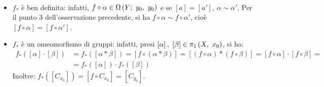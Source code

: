 \begin{demonstration}~{}
	\begin{itemize}
		\item $f_{\ast}$ è ben definita: infatti, $f\circ\alpha\in\Omega\left(Y;\ y_0,\ y_0\right)$ e se $\left[a\right]=\left[a'\right]$, $\alpha\sim\alpha'$. Per il punto 3 dell'osservazione precedente, si ha $f\circ \alpha\sim f\circ\alpha'$, cioè $\left[f\circ \alpha\right]=\left[f\circ\alpha'\right]$.
		\item $f_{\ast}$ è un omeomorfismo di gruppi: infatti, presi $\left[\alpha\right],\ \left[\beta\right]\in\gruf{X}{x_0}$, si ha:
		\begin{align*}
			f_{\ast}\left(\left[\alpha\right]\cdot\left[\beta\right]\right)&=f_{\ast}\left(\left[\alpha\ast\beta\right]\right)=\left[f\circ\left(\alpha\ast\beta\right)\right]=\left[\left(f\circ\alpha\right)\ast\left(f\circ\beta\right)\right]=\left[f\circ\alpha\right]\cdot\left[f\circ\beta\right]=\\&=f_{\ast}\left(\left[\alpha\right]\right)\cdot f_{\ast}\left(\left[\beta\right]\right)
		\end{align*}
	Inoltre: $f_{\ast}\left(\left[C_{x_0}\right]\right)=\left[f\circ C_{x_0}\right]=\left[C_{y_0}\right]$.
	\end{itemize}
\vspace{-3mm}
\end{demonstration}
